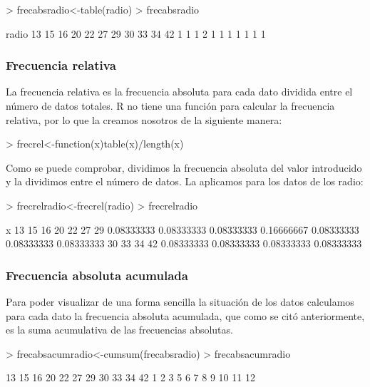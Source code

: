 \documentclass [a4paper] {article}
\begin{document}
\begin{Schunk}
\begin{Sinput}
> frecabsradio<-table(radio)
> frecabsradio
\end{Sinput}
\begin{Soutput}
radio
13 15 16 20 22 27 29 30 33 34 42 
 1  1  1  2  1  1  1  1  1  1  1 
\end{Soutput}
\end{Schunk}

\subsubsection{Frecuencia relativa}
La frecuencia relativa es la frecuencia absoluta para cada dato dividida entre el número de datos totales.
R no tiene una función para calcular la frecuencia relativa, por lo que la creamos nosotros de la siguiente manera:

\begin{Schunk}
\begin{Sinput}
> frecrel<-function(x){table(x)/length(x)}
\end{Sinput}
\end{Schunk}

Como se puede comprobar, dividimos la frecuencia absoluta del valor introducido y la dividimos entre el número de datos.
La aplicamos para los datos de los radio:

\begin{Schunk}
\begin{Sinput}
> frecrelradio<-frecrel(radio)
> frecrelradio
\end{Sinput}
\begin{Soutput}
x
        13         15         16         20         22         27         29 
0.08333333 0.08333333 0.08333333 0.16666667 0.08333333 0.08333333 0.08333333 
        30         33         34         42 
0.08333333 0.08333333 0.08333333 0.08333333 
\end{Soutput}
\end{Schunk}

\subsubsection{Frecuencia absoluta acumulada}
Para poder visualizar de una forma sencilla la situación de los datos calculamos para cada dato la frecuencia absoluta
acumulada, que como se citó anteriormente, es la suma acumulativa de las frecuencias absolutas.

\begin{Schunk}
\begin{Sinput}
> frecabsacumradio<-cumsum(frecabsradio)
> frecabsacumradio
\end{Sinput}
\begin{Soutput}
13 15 16 20 22 27 29 30 33 34 42 
 1  2  3  5  6  7  8  9 10 11 12 
\end{Soutput}
\end{Schunk}
\end{document}
